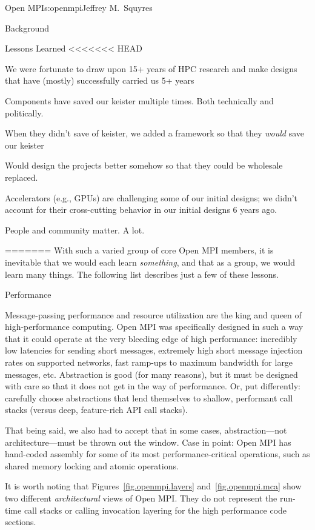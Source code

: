 \begin{aosachapter}{Open MPI}{s:openmpi}{Jeffrey M.\ Squyres}
\begin{aosasect1}{Background}
\begin{aosasect1}{Lessons Learned}
<<<<<<< HEAD
\begin{aosaitemize}
\item We were fortunate to draw upon 15+ years of HPC research and
  make designs that have (mostly) successfully carried us 5+ years
\item Components have saved our keister multiple times.  Both
  technically and politically.
\item When they didn't save of keister, we added a framework so that
  they {\em would} save our keister
\item Would design the projects better somehow so that they could be
  wholesale replaced.
\item Accelerators (e.g., GPUs) are challenging some of our initial
  designs; we didn't account for their cross-cutting behavior in our
  initial designs 6 years ago.
\item People and community matter.  A lot.
\end{aosaitemize}

=======
With such a varied group of core Open MPI members, it is inevitable that
we would each learn \emph{something}, and that as a group, we would
learn many things.  The following list describes just a few of these
lessons.


\begin{aosasect2}{Performance}

Message-passing performance and resource utilization are the king
and queen of high-performance computing.
%
Open MPI was specifically designed in such a way that it could operate
at the very bleeding edge of high performance: incredibly low
latencies for sending short messages, extremely high short message
injection rates on supported networks, fast ramp-ups to maximum
bandwidth for large messages, etc.
%
Abstraction is good (for many reasons), but it must be designed with
care so that it does not get in the way of performance.  Or, put
differently: carefully choose abstractions that lend themselves to
shallow, performant call stacks (versus deep, feature-rich API call
stacks).

That being said, we also had to accept that in some cases, abstraction---not 
architecture---must be thrown out the window.  Case in point:
Open MPI has hand-coded assembly for some of its most
performance-critical operations, such as shared memory locking and
atomic operations.

It is worth noting that Figures~\ref{fig.openmpi.layers}
and~\ref{fig.openmpi.mca} show two different \emph{architectural} views
of Open MPI.
%
They do not represent the run-time call stacks or calling invocation
layering for the high performance code sections.


\end{aosasect2}
\end{aosasect1}
\end{aosasect1}
\end{aosachapter}
